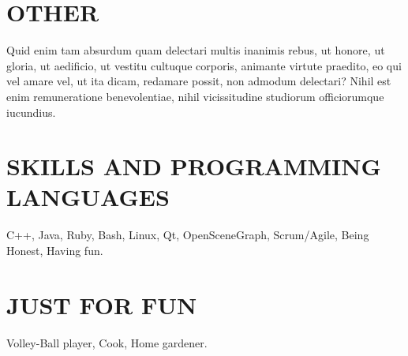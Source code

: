 \documentclass{res}
\begin{document}
\begin{resume}
\begin{tabbing}
   \end{tabbing}\vspace{-20pt}


\section{OTHER}      

Quid enim tam absurdum quam delectari multis inanimis rebus, ut honore, ut gloria, ut aedificio, ut vestitu cultuque corporis, animante virtute praedito, eo qui vel amare vel, ut ita dicam, redamare possit, non admodum delectari? Nihil est enim remuneratione benevolentiae, nihil vicissitudine studiorum officiorumque iucundius.

\section{SKILLS AND PROGRAMMING LANGUAGES}          
    C++, Java, Ruby, Bash, Linux, Qt, OpenSceneGraph, Scrum/Agile, Being Honest, Having fun.
     
\section{JUST FOR FUN}          
    Volley-Ball player, Cook, Home gardener.

\end{resume}
\end{document}
